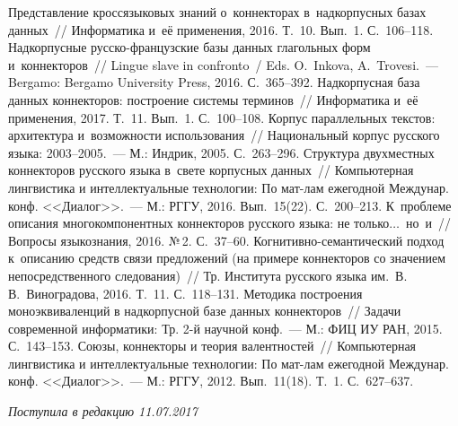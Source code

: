 \begin{multicols}{2}
{{\begin{thebibliography}{99}
Представление кроссязыковых знаний о~коннекторах в~надкорпусных базах данных~// 
Информатика и~её применения, 2016. Т.~10. Вып.~1. С.~106--118. 
Надкорпусные рус\-ско-фран\-цуз\-ские базы данных глагольных форм и~коннекторов~// 
Lingue slave in confronto~/ Eds. O.~Inkova, A.~Trovesi.~--- 
Bergamo: Bergamo University Press, 2016. С.~365--392.
Надкорпусная база данных коннекторов: построение сис\-те\-мы терминов~// 
Информатика и~её применения, 2017. Т.~11. Вып.~1. С.~100--108.
Корпус параллельных текстов: архитектура и~возможности использования~// 
Национальный корпус русского языка: 2003--2005.~--- М.: Индрик, 2005. С.~263--296.
Структура двухместных коннекторов русского языка в~свете корпусных данных~// 
Компьютерная лингвистика и интеллектуальные технологии: По мат-лам 
ежегодной Междунар. конф. <<Диалог>>.~--- М.: РГГУ, 2016.  Вып.~15(22). С.~200--213.
 К~проблеме описания многокомпонентных коннекторов русского языка: 
не только$\ldots$\ но~и~// Вопросы языкознания, 2016. №\,2. С.~37--60.
 Когни\-тив\-но-се\-ман\-ти\-че\-ский 
подход к~описанию средств связи предложений (на примере коннекторов со
 значением непосредственного следования)~// Тр. Института русского языка им.\
  В.\,В.~Виноградова, 2016. Т.~11. С.~118--131.
Методика построения моноэквиваленций в надкорпусной базе данных коннекторов~// 
Задачи современной информатики: Тр. 2-й научной конф.~--- 
М.: ФИЦ ИУ РАН, 2015. С.~143--153.
Союзы, коннекторы и теория валентностей~// 
Компьютерная лингвистика и интеллектуальные технологии: По мат-лам 
ежегодной Междунар. конф. <<Диалог>>.~--- М.: РГГУ, 2012. 
 Вып.~11(18). Т.~1. С.~627--637.


\end{thebibliography}
} }

\end{multicols}

 \label{end\stat}

 \vspace*{-3pt}

\hfill{\small\textit{Поступила в редакцию  11.07.2017}}
\renewcommand{\figurename}{\protect\bf Рис.}
\renewcommand{\tablename}{\protect\bf Таблица}
